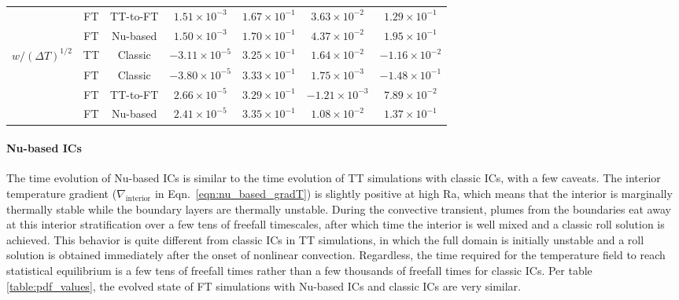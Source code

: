 \documentclass[aps, pre, onecolumn, nofootinbib, notitlepage, groupedaddress, amsfonts, amssymb, amsmath, longbibliography, superscriptaddress]{revtex4-1}
\newcommand{\grad}{\ensuremath{\nabla}}
\newcommand{\ea}[1]{{\color{red} #1}}
\begin{document}
\begin{table}[b!]
\begin{center}
\begin{tabular}{c c c c c c c}
						&	FT	& TT-to-FT	&	$1.51 \times 10^{-3}$	&	$1.67 \times 10^{-1}$	&	$3.63 \times 10^{-2}$	&	$1.29  \times 10^{-1}$ \\
						&	FT	& Nu-based	&	$1.50 \times 10^{-3}$	&	$1.70 \times 10^{-1}$	&	$4.37 \times 10^{-2}$	&	$1.95  \times 10^{-1}$ \\
\hline                                                                                                                    
$w/(\Delta T)^{1/2}$ 	&	TT	& Classic	&	$-3.11 \times 10^{-5}$	&	$3.25 \times 10^{-1}$	&	$1.64 \times 10^{-2}$	&	$-1.16 \times 10^{-2}$ \\
						&	FT	& Classic	&	$-3.80 \times 10^{-5}$	&	$3.33 \times 10^{-1}$	&	$1.75 \times 10^{-3}$	&	$-1.48 \times 10^{-1}$ \\
						&	FT	& TT-to-FT	&	$2.66  \times 10^{-5}$	&	$3.29 \times 10^{-1}$	&	$-1.21 \times 10^{-3}$	&	$7.89  \times 10^{-2}$ \\
						&	FT	& Nu-based	&	$2.41  \times 10^{-5}$	&	$3.35 \times 10^{-1}$	&	$1.08 \times 10^{-2}$	&	$1.37  \times 10^{-1}$ \\
\hline																	
\end{tabular}
\end{center}
\end{table}


\ea{
\paragraph{Nu-based ICs}
The time evolution of Nu-based ICs is similar to the time evolution of TT simulations with classic ICs, with a few caveats.
The interior temperature gradient ($\grad_{\text{interior}}$ in Eqn.~\ref{eqn:nu_based_gradT}) is slightly positive at high Ra, which means that the interior is marginally thermally stable while the boundary layers are thermally unstable.
During the convective transient, plumes from the boundaries eat away at this interior stratification over a few tens of freefall timescales, after which time the interior is well mixed and a classic roll solution is achieved.
This behavior is quite different from classic ICs in TT simulations, in which the full domain is initially unstable and a roll solution is obtained immediately after the onset of nonlinear convection.
Regardless, the time required for the temperature field to reach statistical equilibrium is a few tens of freefall times rather than a few thousands of freefall times for classic ICs.
Per table \ref{table:pdf_values}, the evolved state of FT simulations with Nu-based ICs and classic ICs are very similar.
}
\end{document}
